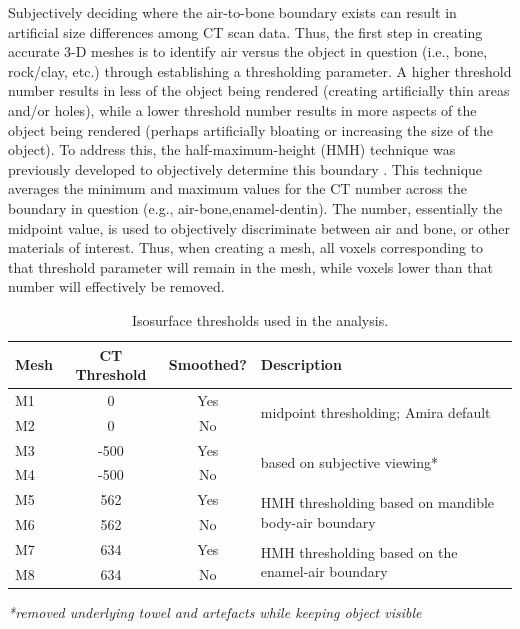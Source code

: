 \documentclass[review]{elsarticle}
\begin{document}
Subjectively deciding where the air-to-bone boundary exists can result in artificial size differences among CT scan data. Thus, the first step in creating accurate 3-D meshes is to identify air versus the object in question (i.e., bone, rock/clay, etc.) through establishing a thresholding parameter. A higher threshold number results in less of the object being rendered (creating artificially thin areas and/or holes), while a lower threshold number results in more aspects of the object being rendered (perhaps artificially bloating or increasing the size of the object). To address this, the half-maximum-height (HMH) technique was previously developed to objectively determine this boundary \citep{RN11483,RN11485,RN11486}. This technique averages the minimum and maximum values for the CT number across the boundary in question (e.g., air-bone,enamel-dentin). The number, essentially the midpoint value, is used to objectively discriminate between air and bone, or other materials of interest. Thus, when creating a mesh, all voxels corresponding to that threshold parameter will remain in the mesh, while voxels lower than that number will effectively be removed. 

\begin{table}[tbh]\centering
\footnotesize
\caption{Isosurface thresholds used in the analysis.}
\centering
\begin{tabular}{lccp{6cm}}
\hline
Mesh & CT Threshold & Smoothed? & Description\\
\hline
M1 & 0 & Yes & \multirow{2}{5cm}{midpoint thresholding; Amira default}\\
M2 & 0 & No & \\
M3 & -500 & Yes & \multirow{2}{5cm}{based on subjective viewing*}\\
M4 & -500 & No & \\
M5 & 562 & Yes & \multirow{2}{5cm}{HMH thresholding based on mandible body-air boundary}\\
M6 & 562 & No & \\
M7 & 634 & Yes & \multirow{2}{5cm}{HMH thresholding based on the enamel-air boundary}\\
M8 & 634 & No & \\
\hline
\end{tabular}
\textit{*removed underlying towel and artefacts while keeping object visible }
\label{tab:Tbl1}
\end{table}
\end{document}
